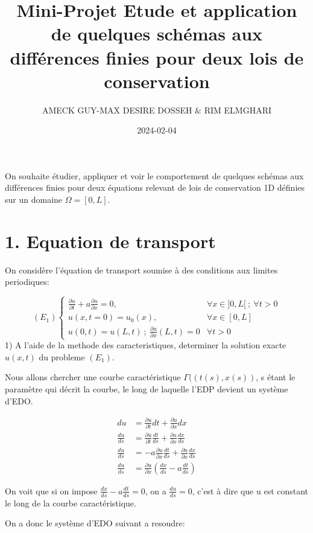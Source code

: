 \documentclass[
]{article}
\title{Mini-Projet Etude et application de quelques schémas aux
différences finies pour deux lois de conservation}
\author{AMECK GUY-MAX DESIRE DOSSEH \& RIM ELMGHARI}
\date{2024-02-04}
\begin{document}
\maketitle

On souhaite étudier, appliquer et voir le comportement de quelques
schémas aux différences finies pour deux équations relevant de lois de
conservation 1D définies sur un domaine \(\Omega = [0, L]\).

\hypertarget{equation-de-transport}{%
\section{1. Equation de transport}\label{equation-de-transport}}

On considère l'équation de transport soumise à des conditions aux
limites periodiques:

\[
(E_{1})\left\{
\begin{array}{ll}
\frac{\partial u}{\partial t} + a\frac{\partial u}{\partial x} = 0, & \forall x \in ]0,L[\  ; \ \forall t>0 \\
u(x, t=0) = u_0(x), & \forall x \in [0,L] \\
u(0, t) = u(L, t)\ ; \ \frac{\partial u}{\partial x}(L, t)=0 & \forall t > 0
\end{array}
\right.
\] 1) A l'aide de la methode des caracteristiques, determiner la
solution exacte \(u(x, t)\) du probleme \((E_{1})\).

Nous allons chercher une courbe caractéristique
\(\Gamma ((t(s), x(s))\), s étant le paramètre qui décrit la courbe, le
long de laquelle l'EDP devient un système d'EDO.

\[
\begin{aligned}
du &= \frac{\partial u}{\partial t}dt + \frac{\partial u}{\partial x}dx\\
\frac{du}{ds} &= \frac{\partial u}{\partial t}\frac{dt}{ds} + \frac{\partial u}{\partial x}\frac{dx}{ds}\\
\frac{du}{ds} &= -a\frac{\partial u}{\partial x}\frac{dt}{ds} + \frac{\partial u}{\partial x}\frac{dx}{ds}\\
\frac{du}{ds} &= \frac{\partial u}{\partial x}(\frac{dx}{ds}-a\frac{dt}{ds})
\end{aligned}
\]

On voit que si on impose \(\frac{dx}{ds}-a\frac{dt}{ds} = 0\), on a
\(\frac{du}{ds} = 0\), c'est à dire que u est constant le long de la
courbe caractéristique.

On a donc le système d'EDO suivant a resoudre:
\end{document}
